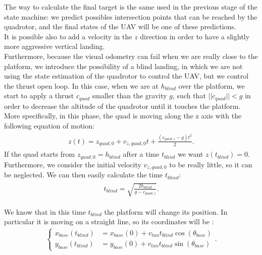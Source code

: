 The way to calculate the final target is the same used in the previous stage of the state machine: we predict possibles intersection points that can be reached by the quadrotor, and the final states of the UAV will be one of these predictions.\\
It is possible also to add a velocity in the $z$ direction in order to have a slightly more aggressive vertical landing.\\
Furthermore, because the visual odometry can fail when we are really close to the platform, we introduce the possibility of a blind landing, in which we are not using the state estimation of the quadrotor to control the UAV, but we control the thrust open loop. In this case, when we are at $h_{blind}$ over the platform, we start to apply a thrust $c_{quad}$ smaller than the gravity $g$, such that $||c_{quad}|| < g$ in order to decrease the altitude of the quadrotor until it touches the platform.\\
More specifically, in this phase, the quad is moving along the z axis with the following equation of motion:
\begin{align}
\begin{split}
z(t) = z_{quad,0} + v_{z,quad,0}t + \frac{(c_{quad,z} - g)t^2}{2}.
\label{eq:z_dynamics}
\end{split}
\end{align}
If the quad starts from $z_{quad,0} = h_{blind}$ after a time $t_{blind}$ we want $z(t_{blind}) = 0$. Furthermore, we consider the initial velocity $v_{z,quad,0}$ to be really little, so it can be neglected. We can then easily calculate the time $t_{blind}$:
\begin{align}
\begin{split}
t_{blind} = \sqrt{\frac{2h_{blind}}{g-c_{quad,z}}}.
\label{eq:z_dynamics}
\end{split}
\end{align}

We know that in this time $t_{blind}$ the platform will change its position. In particular it is moving on a straight line, so its coordinates will be :
\begin{align}
\begin{cases}
x_{base}(t_{blind}) &= x_{base}(0) + v_{tan}t_{blind}\cos{(\theta_{base})}\\[5pt]
y_{base}(t_{blind}) &= y_{base}(0) + v_{tan}t_{blind}\sin{(\theta_{base})}
\end{cases}.
\label{eq:future_pose_blind}
\end{align}

